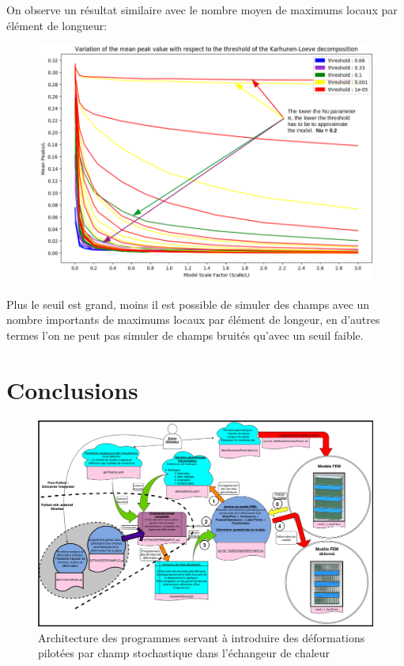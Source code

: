 \documentclass[a4paper,10pt]{article}
\begin{document}
	 On observe un résultat similaire avec le nombre moyen de maximums locaux par élément de longueur: 

\begin{figure}[H]
   \centering   
   \noindent \includegraphics[width = \linewidth]{MeanPeakValKL.png}
      \caption{}
         \label{MeanPeakValKL}
\end{figure}
	 
	Plus le seuil est grand, moins il est possible de simuler des champs avec un nombre importants de maximums locaux par élément de longeur, en d'autres termes l'on ne peut pas simuler de champs bruités qu'avec un seuil faible.

\section{Conclusions}




\appendix 
\appendixpage
\addappheadtotoc

\begin{figure}[H]
   \centering
   \vspace{-2cm}
   \includegraphics[angle=-90,origin=c,width=1.1\textwidth,height=1.1\textheight,keepaspectratio]{SchemaDeformationNastran.jpg}
      \caption{Architecture des programmes servant à introduire des déformations pilotées par champ stochastique dans l'échangeur de chaleur}
         \label{SchemaDeformationNastran}
\end{figure}
\end{document}
